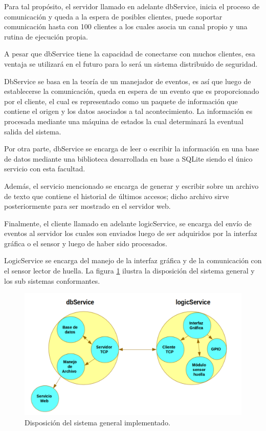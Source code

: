 Para tal propósito, el servidor llamado en adelante dbService, inicia el proceso de comunicación y queda a la espera de posibles clientes, puede soportar comunicación hasta con 100 clientes a los cuales asocia un canal propio y una rutina de ejecución propia.

A pesar que dbService tiene la capacidad de conectarse con muchos clientes, esa ventaja se utilizará en el futuro para lo será un sistema distribuido de seguridad.

DbService se basa en la teoría de un manejador de eventos, es así que luego de establecerse la comunicación, queda en espera de un evento que es proporcionado por el cliente, el cual es representado como un paquete de información que contiene el origen y los datos asociados a tal acontecimiento. La información es procesada mediante una máquina de estados la cual determinará la eventual salida del sistema.

Por otra parte, dbService se encarga de leer o escribir la información en una base de datos mediante una biblioteca desarrollada en base a SQLite siendo el único servicio con esta facultad.

Además, el servicio mencionado se encarga de generar y escribir sobre un archivo de texto que contiene el historial de últimos accesos; dicho archivo sirve posteriormente para ser mostrado en el servidor web.

Finalmente, el cliente llamado en adelante logicService, se encarga del envío de eventos al servidor los cuales son enviados luego de ser adquiridos por la interfaz gráfica o el sensor y luego de haber sido procesados.

LogicService se encarga del manejo de la interfaz gráfica y de la comunicación con el sensor lector de huella.
La figura \ref{fig:sistemagen} ilustra la disposición del sistema general y los sub sistemas conformantes.

\begin{figure}[h]
	\centering
	\includegraphics[scale=.3]{./Figures/sistemagen.png}
	\caption{Disposición del sistema general implementado.}
	\label{fig:sistemagen}
\end{figure}

